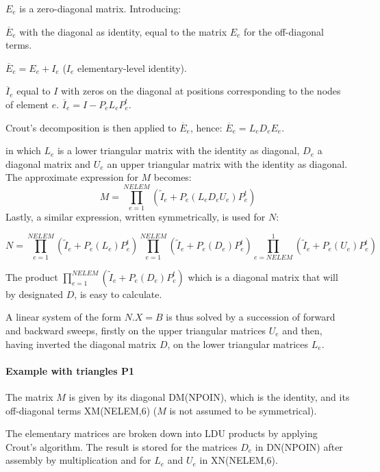 $E_{e}$ is a zero-diagonal matrix. Introducing:

$\overline{E}_{e}$ with the diagonal as identity, equal to the matrix $E_e$ for
the off-diagonal terms.

$\overline{E}_{e} =E_{e} +I_{e}$ ($I_e$ elementary-level identity).

$\overline{I}_{e}$ equal to $I$ with zeros on the diagonal at positions
corresponding to the nodes of element $e$.
$\overline{I}_{e} =I-P_{e} L_{e} P_{e}^{t} $.

Crout's decomposition is then applied to $\overline{E}_{e} $,
hence: $\overline{E}_{e} =L_{e} D_{e} E_{e} $.

in which $L_{e}$ is a lower triangular matrix with  the identity as diagonal,
$D_e$ a diagonal matrix and $U_e$ an upper triangular matrix with the identity
as diagonal. The approximate expression for $M$ becomes:
\[M=\prod _{e=1}^{NELEM}(\tilde{I}_{e} +P_{e} (L_{e} D_{e} U_{e} )P_{e}^{t} ) \]
Lastly, a similar expression, written symmetrically, is used for $N$:

\[N=\prod _{e=1}^{NELEM}(\tilde{I}_{e} +P_{e} (L_{e} )P_{e}^{t} ) \prod _{e=1}^{NELEM}(\tilde{I}_{e} +P_{e} (D_{e} )P_{e}^{t} ) \prod _{e=NELEM}^{1}(\tilde{I}_{e} +P_{e} (U_{e} )P_{e}^{t} ) \]

The product $\prod _{e=1}^{NELEM}(\tilde{I}_{e} +P_{e} (D_{e} )P_{e}^{t} ) $
which is a diagonal matrix that will by designated $D$, is easy to calculate.

A linear system of the form $N.X = B$ is thus solved by a succession of forward
and backward sweeps, firstly on the upper triangular matrices $U_e$ and then,
having inverted the diagonal matrix $D$, on the lower triangular matrices $L_{e}$.

\paragraph{Example with triangles P1}

The matrix $M$ is given by its diagonal DM(NPOIN), which is the identity, and
its off-diagonal terms XM(NELEM,6) ($M$ is not assumed to be symmetrical).


The elementary matrices are broken down into LDU products by applying Crout's
algorithm.
The result is stored for the matrices $D_e$ in DN(NPOIN) after assembly
by multiplication and for $L_e$ and $U_e$ in XN(NELEM,6).

